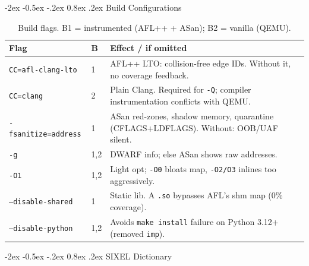 \documentclass[letterpaper,twocolumn,10pt]{article}
\begin{document}
\makeatletter
\renewcommand\section{\@startsection{section}{1}{\z@}%
  {-2ex \@plus -0.5ex \@minus -.2ex}%
  {0.8ex \@plus.2ex}%
  {\normalfont\Large\bfseries}}
\makeatother

\section{Build Configurations}
\label{app:builds}
\vspace{-0.8em}

\begin{table}[H]
\centering\scriptsize
\setlength{\tabcolsep}{3pt}
\begin{tabular}{@{}llp{4.3cm}@{}}
\toprule
\textbf{Flag} & \textbf{B} & \textbf{Effect / if omitted} \\
\midrule
\texttt{CC=afl-clang-lto}    & 1    & AFL++ LTO: collision-free edge IDs. Without it, no coverage feedback. \\
\texttt{CC=clang}            & 2    & Plain Clang. Required for \texttt{-Q}; compiler instrumentation conflicts with QEMU. \\
\texttt{-fsanitize=address}  & 1    & ASan red-zones, shadow memory, quarantine (CFLAGS+LDFLAGS). Without: OOB/UAF silent. \\
\texttt{-g}                  & 1,2  & DWARF info; else ASan shows raw addresses. \\
\texttt{-O1}                 & 1,2  & Light opt; \texttt{-O0} bloats map, \texttt{-O2/O3} inlines too aggressively. \\
\texttt{--disable-shared}    & 1    & Static lib. A \texttt{.so} bypasses AFL's shm map (0\% coverage). \\
\texttt{--disable-python}    & 1,2  & Avoids \texttt{make install} failure on Python 3.12+ (removed \texttt{imp}). \\
\bottomrule
\end{tabular}
\caption{Build flags. B1 = instrumented (AFL++ + ASan); B2 = vanilla (QEMU).}
\label{tab:builds}
\end{table}

\section{SIXEL Dictionary}
\label{app:dict}
\vspace{-0.8em}
\end{document}
